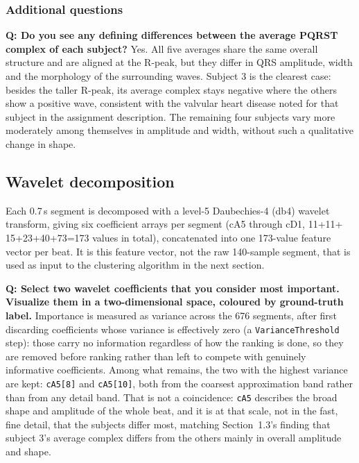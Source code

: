 \documentclass[11pt,a4paper]{article}
\newcommand{\second}{s}
\newcommand{\num}[1]{#1}
\newcommand{\SI}[2]{#1\,#2}
\begin{document}
\subsubsection{Additional questions}

\textbf{Q: Do you see any defining differences between the average PQRST complex of each
subject?} Yes. All five averages share the same overall structure and are aligned at the
R-peak, but they differ in QRS amplitude, width and the morphology of the surrounding waves.
Subject 3 is the clearest case: besides the taller R-peak, its average complex stays negative
where the others show a positive wave, consistent with the valvular heart disease noted for
that subject in the assignment description. The remaining four subjects vary more moderately
among themselves in amplitude and width, without such a qualitative change in shape.

\subsection{Wavelet decomposition}

Each \SI{0.7}{\second} segment is decomposed with a level-5 Daubechies-4 (db4) wavelet
transform, giving six coefficient arrays per segment (cA5 through cD1, \num{11}+\num{11}+
\num{15}+\num{23}+\num{40}+\num{73}=\num{173} values in total), concatenated into one
\num{173}-value feature vector per beat. It is this feature vector, not the raw \num{140}-sample
segment, that is used as input to the clustering algorithm in the next section.

\textbf{Q: Select two wavelet coefficients that you consider most important. Visualize them in
a two-dimensional space, coloured by ground-truth label.} Importance is measured as variance
across the \num{676} segments, after first discarding coefficients whose variance is
effectively zero (a \texttt{VarianceThreshold} step): those carry no information regardless of
how the ranking is done, so they are removed before ranking rather than left to compete with
genuinely informative coefficients. Among what remains, the two with the highest variance are
kept: \texttt{cA5[8]} and \texttt{cA5[10]}, both from the coarsest approximation band rather
than from any detail band. That is not a coincidence: \texttt{cA5} describes the broad shape
and amplitude of the whole beat, and it is at that scale, not in the fast, fine detail, that the
subjects differ most, matching Section~1.3's finding that subject 3's average complex differs
from the others mainly in overall amplitude and shape.
\end{document}
